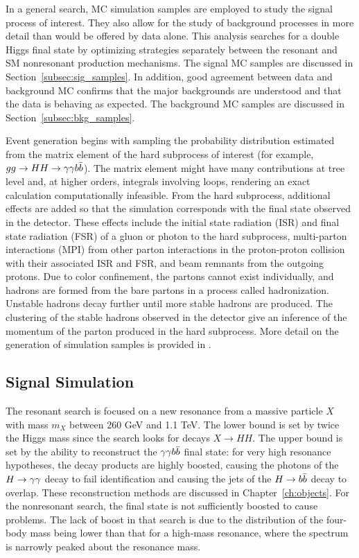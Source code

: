 
In a general search, MC simulation samples are employed to study the signal process of interest.
They also allow for the study of background processes in more detail
than would be offered by data alone.
This analysis searches for a double Higgs final
state by optimizing strategies separately between the resonant and
SM nonresonant production mechanisms.
The signal MC samples are discussed in Section~\ref{subsec:sig_samples}.
In addition, good agreement between data
and background MC confirms that the major backgrounds are understood and that
the data is behaving as expected. The background MC samples are discussed in
Section~\ref{subsec:bkg_samples}.

Event generation begins with sampling the probability distribution
estimated from the matrix element of the hard subprocess of interest
(for example, $gg\rightarrow HH\rightarrow \gamma\gamma b\bar{b}$). The matrix element
might have many contributions at tree level and, at higher orders, integrals involving loops, rendering
an exact calculation computationally infeasible.
From the hard subprocess, additional effects are added so that the simulation corresponds with
the final state observed in the detector. These effects include the initial state radiation (ISR)
and final state radiation (FSR) of a gluon or photon to the hard subprocess, multi-parton
interactions (MPI) from other parton interactions in the proton-proton collision with their
associated ISR and FSR, and beam remnants from the outgoing protons. Due to color confinement,
the partons cannot exist individually, and hadrons are formed from the bare partons in
a process called hadronization. Unstable hadrons decay further until more stable hadrons are
produced. The clustering of the stable hadrons observed in the detector give an inference of the
momentum of the parton produced in the hard subprocess.
More detail on the generation of simulation samples is provided in \cite{Dobbs:2004qw,Bartalini:2011jp}.

\subsection{Signal Simulation\label{subsec:sig_samples}}

The resonant search is focused on a new resonance from a massive particle $X$ with mass $m_X$ between
260 GeV and 1.1 TeV. The lower bound is set by twice the Higgs mass since the search looks for decays
$X\rightarrow HH$. The upper bound is set by the ability to reconstruct the $\gamma\gamma b\bar{b}$ final state: for
very high resonance hypotheses, the decay products are highly boosted, causing the photons of the
$H\to\gamma\gamma$ decay to fail identification and causing the jets of the $H\to b\bar{b}$ decay to overlap.
These reconstruction methods are discussed in Chapter~\ref{ch:objects}. For the nonresonant
search, the final state is not sufficiently boosted to cause problems. The lack of boost in that
search is due to the distribution of the four-body mass being lower than that for
a high-mass resonance, where the spectrum is narrowly peaked about the resonance mass.

